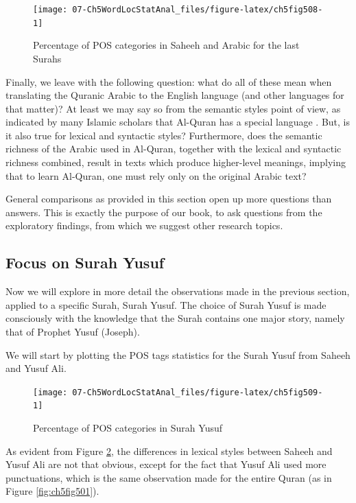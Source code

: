 \documentclass[
]{article}
\begin{document}
\begin{figure}

{\centering \texttt{[image: 07-Ch5WordLocStatAnal\_files/figure-latex/ch5fig508-1]} 

}

\caption{Percentage of POS categories in Saheeh and Arabic for the last Surahs}\label{fig:ch5fig508}
\end{figure}

Finally, we leave with the following question: what do all of these mean when translating the Quranic Arabic to the English language (and other languages for that matter)? At least we may say so from the semantic styles point of view, as indicated by many Islamic scholars that Al-Quran has a special language \citep{saeh2015}. But, is it also true for lexical and syntactic styles? Furthermore, does the semantic richness of the Arabic used in Al-Quran, together with the lexical and syntactic richness combined, result in texts which produce higher-level meanings, implying that to learn Al-Quran, one must rely only on the original Arabic text?

General comparisons as provided in this section open up more questions than answers. This is exactly the purpose of our book, to ask questions from the exploratory findings, from which we suggest other research topics.

\hypertarget{focus-on-surah-Yusuf}{%
\subsection{Focus on Surah Yusuf}\label{focus-on-surah-Yusuf}}

Now we will explore in more detail the observations made in the previous section, applied to a specific Surah, Surah Yusuf. The choice of Surah Yusuf is made consciously with the knowledge that the Surah contains one major story, namely that of Prophet Yusuf (Joseph).

We will start by plotting the POS tags statistics for the Surah Yusuf from Saheeh and Yusuf Ali.

\begin{figure}

{\centering \texttt{[image: 07-Ch5WordLocStatAnal\_files/figure-latex/ch5fig509-1]} 

}

\caption{Percentage of POS categories in Surah Yusuf}\label{fig:ch5fig509}
\end{figure}

As evident from Figure \ref{fig:ch5fig509}, the differences in lexical styles between Saheeh and Yusuf Ali are not that obvious, except for the fact that Yusuf Ali used more punctuations, which is the same observation made for the entire Quran (as in Figure \ref{fig:ch5fig501}).
\end{document}
